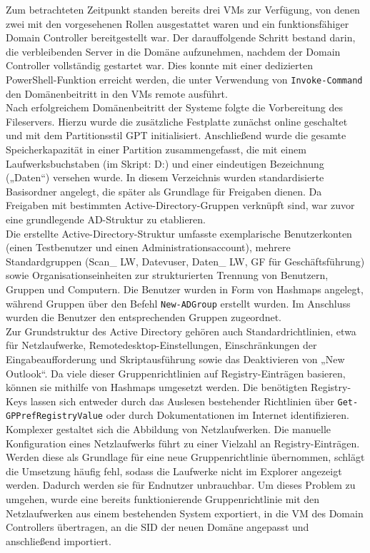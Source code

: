 \documentclass[a4paper,12pt]{article}
\begin{document}
Zum betrachteten Zeitpunkt standen bereits drei VMs zur Verfügung, von denen zwei mit den vorgesehenen Rollen ausgestattet waren und ein funktionsfähiger Domain Controller bereitgestellt war. 
Der darauffolgende Schritt bestand darin, die verbleibenden Server in die Domäne aufzunehmen, nachdem der Domain Controller vollständig gestartet war. 
Dies konnte mit einer dedizierten PowerShell-Funktion erreicht werden, die unter Verwendung von \lstinline|Invoke-Command| den Domänenbeitritt in den VMs remote ausführt.\\

Nach erfolgreichem Domänenbeitritt der Systeme folgte die Vorbereitung des Fileservers. 
Hierzu wurde die zusätzliche Festplatte zunächst online geschaltet und mit dem Partitionsstil GPT initialisiert. 
Anschließend wurde die gesamte Speicherkapazität in einer Partition zusammengefasst, die mit einem Laufwerksbuchstaben (im Skript: D:) und einer eindeutigen Bezeichnung („Daten“) versehen wurde. 
In diesem Verzeichnis wurden standardisierte Basisordner angelegt, die später als Grundlage für Freigaben dienen. 
Da Freigaben mit bestimmten Active-Directory-Gruppen verknüpft sind, war zuvor eine grundlegende AD-Struktur zu etablieren.\\

Die erstellte Active-Directory-Struktur umfasste exemplarische Benutzerkonten (einen Testbenutzer und einen Administrationsaccount), mehrere Standardgruppen (Scan\_ LW, Datevuser, Daten\_ LW, GF für Geschäftsführung) sowie Organisationseinheiten zur strukturierten Trennung von Benutzern, Gruppen und Computern. 
Die Benutzer wurden in Form von Hashmaps angelegt, während Gruppen über den Befehl \lstinline|New-ADGroup| erstellt wurden. 
Im Anschluss wurden die Benutzer den entsprechenden Gruppen zugeordnet.\\

Zur Grundstruktur des Active Directory gehören auch Standardrichtlinien, etwa für Netzlaufwerke, Remotedesktop-Einstellungen, Einschränkungen der Eingabeaufforderung und Skriptausführung sowie das Deaktivieren von „New Outlook“. 
Da viele dieser Gruppenrichtlinien auf Registry-Einträgen basieren, können sie mithilfe von Hashmaps umgesetzt werden. 
Die benötigten Registry-Keys lassen sich entweder durch das Auslesen bestehender Richtlinien über \lstinline|Get-GPPrefRegistryValue| oder durch Dokumentationen im Internet identifizieren.\\

Komplexer gestaltet sich die Abbildung von Netzlaufwerken. Die manuelle Konfiguration eines Netzlaufwerks führt zu einer Vielzahl an Registry-Einträgen. 
Werden diese als Grundlage für eine neue Gruppenrichtlinie übernommen, schlägt die Umsetzung häufig fehl, sodass die Laufwerke nicht im Explorer angezeigt werden. 
Dadurch werden sie für Endnutzer unbrauchbar. 
Um dieses Problem zu umgehen, wurde eine bereits funktionierende Gruppenrichtlinie mit den Netzlaufwerken aus einem bestehenden System exportiert, in die VM des Domain Controllers übertragen, an die SID der neuen Domäne angepasst und anschließend importiert.\\
\end{document}
